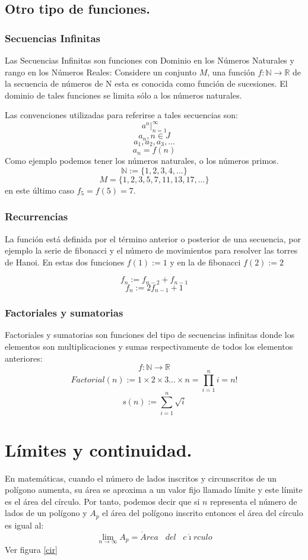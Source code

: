 \documentclass[oneside,spanish,letterpaper]{extbook}
\theoremstyle{mythmstyle}
\begin{document}
\section{Otro tipo de funciones.}
\subsection{Secuencias Infinitas}
 Las Secuencias Infinitas son funciones con Dominio en los Números Naturales y rango en los Números Reales:
Considere un conjunto $M$, una función $f: \mathbb{N}\rightarrow \mathbb{R}$ 
de la secuencia de números de N esta es conocida como función de sucesiones.
El dominio de tales funciones se limita sólo a los números naturales.

Las convenciones utilizadas para referirse a tales secuencias son:
$$a^n |^{\infty}_{n=1}$$
$$a_n, n\in J$$
$$a_1,a_2,a_3,...$$
$$a_n=f(n)$$
Como ejemplo podemos tener los números naturales, o los números primos.
$$\mathbb{N}:=\{1,2,3,4,...\}$$
$$M=\{1,2,3,5,7,11,13,17,...\}$$
en este último caso $f_5=f(5)=7$.

\subsection{Recurrencias}
La función está definida por el término anterior o posterior de una secuencia, por ejemplo la serie de 
fibonacci y el número de movimientos para resolver las torres de Hanoi. En estas dos funciones $f(1):=1$ 
y en la de fibonacci $f(2):=2$

$$f_n:=f_{n-2}+f_{n-1}$$
$$f_n:=2f_{n-1}+1$$
\subsection{Factoriales y sumatorias}
Factoriales y sumatorias son funciones del tipo de secuencias infinitas donde los elementos
son multiplicaciones y sumas respectivamente de todos los elementos anteriores:
$$f:\mathbb{N}\rightarrow \mathbb{R}$$
$$Factorial(n):=1\times 2\times  3...\times  n=\underset{i=1}{\overset{n}{\prod}} i=n!$$
$$s(n):=\underset{i=1}{\overset{n}{\sum}} \sqrt{i}$$

\chapter{Límites y continuidad.}
En matemáticas, cuando el número de lados inscritos y circunscritos de un polígono aumenta, su área se
aproxima a un valor fijo llamado límite y este límite es el área del círculo. Por tanto, podemos decir
que si $n$ representa el número de lados de un polígono y $A_p$ el área del polígono inscrito entonces el área
del círculo es igual al:
$$\underset{n\rightarrow \infty}{\lim}A_p=\acute{A}rea\;\;\;del\;\;\;c\acute{\imath}rculo$$
Ver figura \ref{cir}
\end{document}
